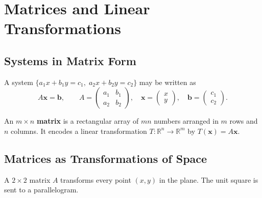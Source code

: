 \documentclass[11pt, openany]{book}
\theoremstyle{plain}
\theoremstyle{definition}
\theoremstyle{remark}
\newcommand{\R}{\mathbb{R}}
\begin{document}
\chapter{Matrices and Linear Transformations}

\section{Systems in Matrix Form}

A system $\{a_1x+b_1y=c_1,\;a_2x+b_2y=c_2\}$ may be written as
\[
  A\mathbf{x}=\mathbf{b},
  \qquad
  A=\begin{pmatrix}a_1&b_1\\a_2&b_2\end{pmatrix},\quad
  \mathbf{x}=\begin{pmatrix}x\\y\end{pmatrix},\quad
  \mathbf{b}=\begin{pmatrix}c_1\\c_2\end{pmatrix}.
\]

\begin{mydefinition}[Matrix]
An $m\times n$ \textbf{matrix} is a rectangular array of $mn$ numbers
arranged in $m$ rows and $n$ columns. It encodes a linear transformation
$T:\R^n\to\R^m$ by $T(\mathbf{x})=A\mathbf{x}$.
\end{mydefinition}

\section{Matrices as Transformations of Space}

A $2\times2$ matrix $A$ transforms every point $(x,y)$ in the plane. The
unit square is sent to a parallelogram.

\begin{center}
\end{center}
\end{document}
